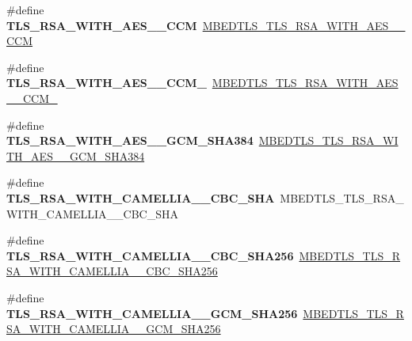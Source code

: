 \begin{DoxyCompactItemize}
\item 
\mbox{\label{compat-1_83_8h_a2df7b23c7917aad60d1654e3826ca388}} 
\#define {\bfseries T\+L\+S\+\_\+\+R\+S\+A\+\_\+\+W\+I\+T\+H\+\_\+\+A\+E\+S\+\_\+\_\+\+C\+CM}~\mbox{\hyperlink{ssl__ciphersuites_8h_a81e67c978273a06bdf315383f5799c14}{M\+B\+E\+D\+T\+L\+S\+\_\+\+T\+L\+S\+\_\+\+R\+S\+A\+\_\+\+W\+I\+T\+H\+\_\+\+A\+E\+S\+\_\+\_\+\+C\+CM}}
\item 
\mbox{\label{compat-1_83_8h_a4e834323b40bc42a0b89ce69ca6fc75f}} 
\#define {\bfseries T\+L\+S\+\_\+\+R\+S\+A\+\_\+\+W\+I\+T\+H\+\_\+\+A\+E\+S\+\_\+\_\+\+C\+C\+M\+\_}~\mbox{\hyperlink{ssl__ciphersuites_8h_ab216990126f163693a744f89da89342c}{M\+B\+E\+D\+T\+L\+S\+\_\+\+T\+L\+S\+\_\+\+R\+S\+A\+\_\+\+W\+I\+T\+H\+\_\+\+A\+E\+S\+\_\+\_\+\+C\+C\+M\+\_}}
\item 
\mbox{\label{compat-1_83_8h_a275538776fa5a59590823e1c671aed67}} 
\#define {\bfseries T\+L\+S\+\_\+\+R\+S\+A\+\_\+\+W\+I\+T\+H\+\_\+\+A\+E\+S\+\_\+\_\+\+G\+C\+M\+\_\+\+S\+H\+A384}~\mbox{\hyperlink{ssl__ciphersuites_8h_aa36867dde89d76a33c6d44f920900bf8}{M\+B\+E\+D\+T\+L\+S\+\_\+\+T\+L\+S\+\_\+\+R\+S\+A\+\_\+\+W\+I\+T\+H\+\_\+\+A\+E\+S\+\_\+\_\+\+G\+C\+M\+\_\+\+S\+H\+A384}}
\item 
\mbox{\label{compat-1_83_8h_a358635ef2fade358c9765c77cfe2adb4}} 
\#define {\bfseries T\+L\+S\+\_\+\+R\+S\+A\+\_\+\+W\+I\+T\+H\+\_\+\+C\+A\+M\+E\+L\+L\+I\+A\+\_\+\_\+\+C\+B\+C\+\_\+\+S\+HA}~M\+B\+E\+D\+T\+L\+S\+\_\+\+T\+L\+S\+\_\+\+R\+S\+A\+\_\+\+W\+I\+T\+H\+\_\+\+C\+A\+M\+E\+L\+L\+I\+A\+\_\+\_\+\+C\+B\+C\+\_\+\+S\+HA
\item 
\mbox{\label{compat-1_83_8h_acbaa4521b0d7e9b6f61ad4ba2b718695}} 
\#define {\bfseries T\+L\+S\+\_\+\+R\+S\+A\+\_\+\+W\+I\+T\+H\+\_\+\+C\+A\+M\+E\+L\+L\+I\+A\+\_\+\_\+\+C\+B\+C\+\_\+\+S\+H\+A256}~\mbox{\hyperlink{ssl__ciphersuites_8h_a6ee3cf87a1e96612a864c90588a57892}{M\+B\+E\+D\+T\+L\+S\+\_\+\+T\+L\+S\+\_\+\+R\+S\+A\+\_\+\+W\+I\+T\+H\+\_\+\+C\+A\+M\+E\+L\+L\+I\+A\+\_\+\_\+\+C\+B\+C\+\_\+\+S\+H\+A256}}
\item 
\mbox{\label{compat-1_83_8h_a7edd2231e213dbec6e480b6e72dca8fe}} 
\#define {\bfseries T\+L\+S\+\_\+\+R\+S\+A\+\_\+\+W\+I\+T\+H\+\_\+\+C\+A\+M\+E\+L\+L\+I\+A\+\_\+\_\+\+G\+C\+M\+\_\+\+S\+H\+A256}~\mbox{\hyperlink{ssl__ciphersuites_8h_aed15c4b5481cd4bc67761e97b7cb6501}{M\+B\+E\+D\+T\+L\+S\+\_\+\+T\+L\+S\+\_\+\+R\+S\+A\+\_\+\+W\+I\+T\+H\+\_\+\+C\+A\+M\+E\+L\+L\+I\+A\+\_\+\_\+\+G\+C\+M\+\_\+\+S\+H\+A256}}

\end{DoxyCompactItemize}
